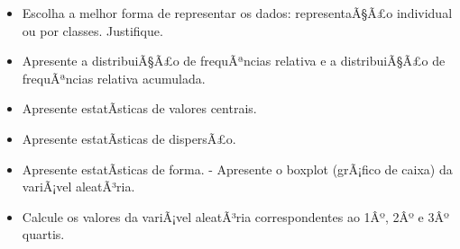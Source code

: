﻿\documentclass[11pt]{article}
\providecommand{\tightlist}{%
      \setlength{\itemsep}{0pt}\setlength{\parskip}{0pt}}
\begin{document}
    \begin{itemize}
\tightlist
\item
  Escolha a melhor forma de representar os dados: representaÃ§Ã£o
  individual ou por classes. Justifique.
\item
  Apresente a distribuiÃ§Ã£o de frequÃªncias relativa e a distribuiÃ§Ã£o de
  frequÃªncias relativa acumulada.
\item
  Apresente estatÃ­sticas de valores centrais.
\item
  Apresente estatÃ­sticas de dispersÃ£o.
\item
  Apresente estatÃ­sticas de forma. - Apresente o boxplot (grÃ¡fico de
  caixa) da variÃ¡vel aleatÃ³ria.
\item
  Calcule os valores da variÃ¡vel aleatÃ³ria correspondentes ao 1Âº, 2Âº e
  3Âº quartis.
\end{itemize}

    
\end{document}
